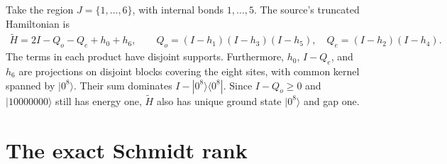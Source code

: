\documentclass{article}
\begin{document}
Take the region $J=\{1,\ldots,6\}$, with internal bonds $1,\ldots,5$.
The source's truncated Hamiltonian is
\begin{align}
 \widetilde H=2I-Q_o-Q_e+h_0+h_6,
 \qquad
 Q_o=(I-h_1)(I-h_3)(I-h_5),\quad
 Q_e=(I-h_2)(I-h_4).
    \label{eq:ff_rank_truncated_hamiltonian}
\end{align}
The terms in each product have disjoint supports.
Furthermore, $h_0$, $I-Q_e$, and $h_6$ are projections on disjoint
blocks covering the eight sites, with common kernel spanned by $|0^8\rangle$.
Their sum dominates $I-|0^8\rangle\langle0^8|$.
Since $I-Q_o\ge0$ and $|10000000\rangle$ still has energy one,
$\widetilde H$ also has unique ground state $|0^8\rangle$ and gap one.

\section{The exact Schmidt rank}
\end{document}
